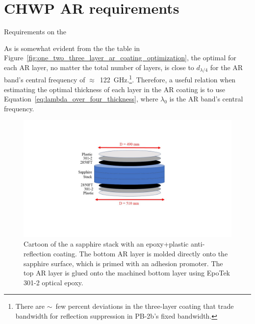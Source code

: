 
\section{CHWP AR requirements}
\label{sec:sapphire_ar_coating_requirements}

Requirements on the 

As is somewhat evident from the the table in Figure~\ref{fig:one_two_three_layer_ar_coating_optimization}, the optimal for each AR layer, no matter the total number of layers, is close to $d_{\lambda / 4}$ for the AR band's central frequency of $\approx$~122~GHz.\footnote{There are $\sim$~few percent deviations in the three-layer coating that trade bandwidth for reflection suppression in PB-2b's fixed bandwidth.}. Therefore, a useful relation when estimating the optimal thickness of each layer in the AR coating is to use Equation~\ref{eq:lambda_over_four_thickness}, where $\lambda_{0}$ is the AR band's central frequency. 

\begin{figure}
    \centering
    \includegraphics[width=0.98\linewidth]{ARCoating/Figures/sapphire_ar_stack_cartoon.jpg}
    \caption[Cartoon of the a sapphire stack with an epoxy+plastic anti-reflection coating]{Cartoon of the a sapphire stack with an epoxy+plastic anti-reflection coating. The bottom AR layer is molded directly onto the sapphire surface, which is primed with an adhesion promoter. The top AR layer is glued onto the machined bottom layer using EpoTek 301-2 optical epoxy.}
    \label{fig:ar_cartoon}
\end{figure}

